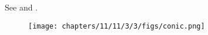 See 
and
.
\begin{figure}[H]
	\begin{center}
		\texttt{[image: chapters/11/11/3/3/figs/conic.png]}
	\end{center}
\caption{}
\label{fig:chapters/11/11/3/3/Fig1}
\end{figure}

